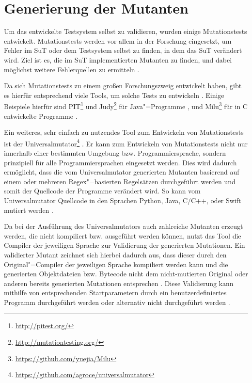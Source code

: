 \section{Generierung der Mutanten}
\label{sec:implMutationTests}

Um das entwickelte Testsystem selbst zu validieren, wurden einige \glspl{Mutationstest} entwickelt.
Mutationstests werden vor allem in der Forschung eingesetzt, um Fehler im \gls{SuT} oder dem Testsystem selbst zu finden, in dem das \gls{SuT} verändert wird.
Ziel ist es, die im \gls{SuT} implementierten Mutanten zu finden, und dabei möglichst weitere Fehlerquellen zu ermitteln \cite{DeMillo1978,Hamlet1977,Jia2011,Groce2018}.

Da sich \glspl{Mutationstest} zu einem großen Forschungszweig entwickelt haben, gibt es hierfür entsprechend viele Tools, um solche Tests zu entwickeln \cite{Jia2011,Groce2018}.
Einige Beispiele hierfür sind PIT\footnote{\url{http://pitest.org/}} und Judy\footnote{\url{http://mutationtesting.org/}} für Java"=Programme \cite{Coles2016,Madeyski2010}, und Milu\footnote{\url{https://github.com/yuejia/Milu}} für in C entwickelte Programme \cite{Jia2008}.

Ein weiteres, sehr einfach zu nutzendes Tool zum Entwickeln von \glspl{Mutationstest} ist der Universalmutator\footnote{\url{https://github.com/agroce/universalmutator}} \cite{Groce2018}.
Er kann zum Entwickeln von \glspl{Mutationstest} nicht nur innerhalb einer bestimmten Umgebung bzw. Programmiersprache, sondern prinzipiell für alle Programmiersprachen eingesetzt werden.
Dies wird dadurch ermöglicht, dass die vom Universalmutator generierten Mutanten basierend auf einem oder mehreren \gls{Regex}"=basierten Regelsätzen durchgeführt werden und somit der Quellcode der Programme verändert wird.
So kann vom Universalmutator Quellcode \uA in den Sprachen Python, Java, C/C++, oder Swift mutiert werden \cite{Groce2018}.

Da bei der Ausführung des Universalmutators auch zahlreiche Mutanten erzeugt werden, die nicht kompiliert bzw. ausgeführt werden können, nutzt das Tool die Compiler der jeweiligen Sprache zur Validierung der generierten Mutationen.
Ein validierter Mutant zeichnet sich hierbei dadurch aus, dass dieser durch den Original"=Compiler der jeweiligen Sprache kompiliert werden kann und die generierten Objektdateien bzw. Bytecode nicht dem nicht-mutierten Original oder anderen bereits generierten Mutationen entsprechen \cite{Groce2018}.
Diese Validierung kann mithilfe von entsprechenden Startparametern durch ein benutzerdefiniertes Programm durchgeführt werden oder alternativ nicht durchgeführt werden \cite{Groce2018,UniversalmutatorSourceGenmutants}.

